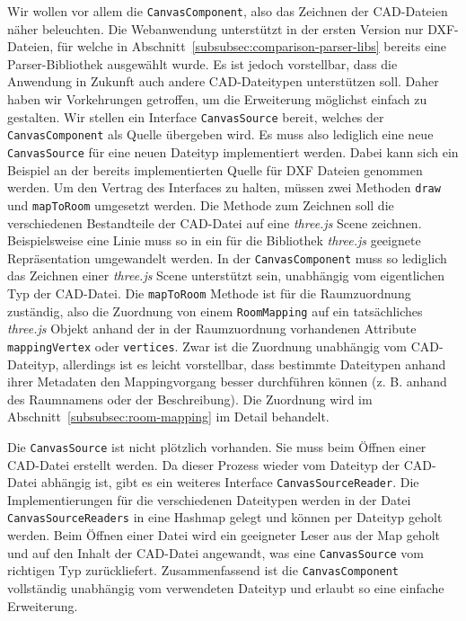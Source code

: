 Wir wollen vor allem die \texttt{CanvasComponent}, also das Zeichnen der CAD-Dateien näher beleuchten.
Die Webanwendung unterstützt in der ersten Version nur DXF-Dateien, für welche in Abschnitt~\ref{subsubsec:comparison-parser-libs} bereits eine Parser-Bibliothek ausgewählt wurde.
Es ist jedoch vorstellbar, dass die Anwendung in Zukunft auch andere CAD-Dateitypen unterstützen soll.
Daher haben wir Vorkehrungen getroffen, um die Erweiterung möglichst einfach zu gestalten.
Wir stellen ein Interface \texttt{CanvasSource} bereit, welches der \texttt{CanvasComponent} als Quelle übergeben wird.
Es muss also lediglich eine neue \texttt{CanvasSource} für eine neuen Dateityp implementiert werden.
Dabei kann sich ein Beispiel an der bereits implementierten Quelle für DXF Dateien genommen werden.
Um den Vertrag des Interfaces zu halten, müssen zwei Methoden \texttt{draw} und \texttt{mapToRoom} umgesetzt werden.
Die Methode zum Zeichnen soll die verschiedenen Bestandteile der CAD-Datei auf eine \textit{three.js} Scene zeichnen.
Beispielsweise eine Linie muss so in ein für die Bibliothek \textit{three.js} geeignete Repräsentation umgewandelt werden.
In der \texttt{CanvasComponent} muss so lediglich das Zeichnen einer \textit{three.js} Scene unterstützt sein, unabhängig vom eigentlichen Typ der CAD-Datei.
Die \texttt{mapToRoom} Methode ist für die Raumzuordnung zuständig, also die Zuordnung von einem \texttt{RoomMapping} auf ein tatsächliches \textit{three.js} Objekt anhand der in der Raumzuordnung vorhandenen Attribute \texttt{mappingVertex} oder \texttt{vertices}.
Zwar ist die Zuordnung unabhängig vom CAD-Dateityp, allerdings ist es leicht vorstellbar, dass bestimmte Dateitypen anhand ihrer Metadaten den Mappingvorgang besser durchführen können (z. B. anhand des Raumnamens oder der Beschreibung).
Die Zuordnung wird im Abschnitt~\ref{subsubsec:room-mapping} im Detail behandelt.

Die \texttt{CanvasSource} ist nicht plötzlich vorhanden.
Sie muss beim Öffnen einer CAD-Datei erstellt werden.
Da dieser Prozess wieder vom Dateityp der CAD-Datei abhängig ist, gibt es ein weiteres Interface \texttt{CanvasSourceReader}.
Die Implementierungen für die verschiedenen Dateitypen werden in der Datei \texttt{CanvasSourceReaders} in eine Hashmap gelegt und können per Dateityp geholt werden.
Beim Öffnen einer Datei wird ein geeigneter \glqq{}Leser\grqq{} aus der Map geholt und auf den Inhalt der CAD-Datei angewandt, was eine \texttt{CanvasSource} vom richtigen Typ zurückliefert.
Zusammenfassend ist die \texttt{CanvasComponent} vollständig unabhängig vom verwendeten Dateityp und erlaubt so eine einfache Erweiterung.

